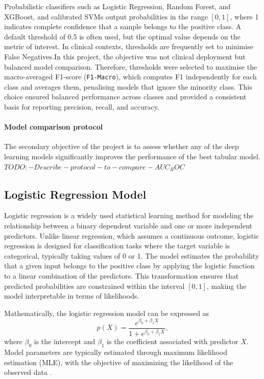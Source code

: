 Probabilistic classifiers such as Logistic Regression, Random Forest, and XGBoost, and calibrated SVMs output probabilities in the range $[0,1]$, where 1 indicates complete confidence that a sample belongs to the positive class. A default threshold of 0.5 is often used, but the optimal value depends on the metric of interest. In clinical contexts, thresholds are frequently set to minimise False Negatives.In this project, the objective was not clinical deployment but balanced model comparison. Therefore, thresholds were selected to maximise the macro-averaged F1-score (\texttt{F1-Macro}), which computes F1 independently for each class and averages them, penalising models that ignore the minority class. This choice ensured balanced performance across classes and provided a consistent basis for reporting precision, recall, and accuracy.


\paragraph{Model comparison protocol}
The secondary objective of the project is to assess whether any of the deep learning models significantly improves the performance of the best tabular model.
$TODO:-Describe-protocol-to-compare-AUC_ROC$
\citep{Sun2014}

\subsection{Logistic Regression Model}\label{subsec:method-log-reg}
Logistic regression is a widely used statistical learning method for modeling the relationship between a binary dependent variable and one or more independent predictors. Unlike linear regression, which assumes a continuous outcome, logistic regression is designed for classification tasks where the target variable is categorical, typically taking values of 0 or 1. The model estimates the probability that a given input belongs to the positive class by applying the logistic function to a linear combination of the predictors. This transformation ensures that predicted probabilities are constrained within the interval $[0, 1]$, making the model interpretable in terms of likelihoods.

Mathematically, the logistic regression model can be expressed as
\begin{equation}
    p(X) = \frac{e^{\beta_0 + \beta_1 X}}{1 + e^{\beta_0 + \beta_1 X}},
\end{equation}
where $\beta_0$ is the intercept and $\beta_1$ is the coefficient associated with predictor $X$. Model parameters are typically estimated through maximum likelihood estimation (MLE), with the objective of maximizing the likelihood of the observed data \citep{James2021Logistic}.

